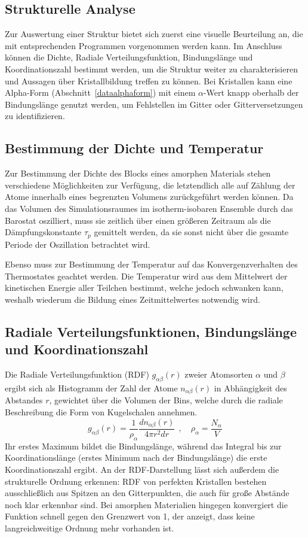 \subsection{Strukturelle Analyse}

Zur Auswertung einer Struktur bietet sich zuerst eine visuelle Beurteilung an, die mit entsprechenden Programmen vorgenommen werden kann.
Im Anschluss können die Dichte, Radiale Verteilungsfunktion, Bindungslänge und Koordinationszahl bestimmt werden, um die Struktur weiter zu charakterisieren und Aussagen über Kristallbildung treffen zu können.
Bei Kristallen kann eine Alpha-Form (Abschnitt~\ref{dataalphaform}) mit einem $\alpha$-Wert knapp oberhalb der Bindungslänge genutzt werden, um Fehlstellen im Gitter oder Gitterversetzungen zu identifizieren.

\subsection{Bestimmung der Dichte und Temperatur}

Zur Bestimmung der Dichte des Blocks eines amorphen Materials stehen verschiedene Möglichkeiten zur Verfügung, die letztendlich alle auf Zählung der Atome innerhalb eines begrenzten Volumens zurückgeführt werden können.
Da das Volumen des Simulationsraumes im isotherm-isobaren Ensemble durch das Barostat oszilliert, muss sie zeitlich über einen größeren Zeitraum als die Dämpfungskonstante $\tau_p$ gemittelt werden, da sie sonst nicht über die gesamte Periode der Oszillation betrachtet wird.

Ebenso muss zur Bestimmung der Temperatur auf das Konvergenzverhalten des Thermostates geachtet werden.
Die Temperatur wird aus dem Mittelwert der kinetischen Energie aller Teilchen bestimmt, welche jedoch schwanken kann, weshalb wiederum die Bildung eines Zeitmittelwertes notwendig wird.

\subsection{Radiale Verteilungsfunktionen, Bindungslänge und Koordinationszahl}

Die Radiale Verteilungsfunktion (RDF) $g_{\alpha\beta}(r)$ zweier Atomsorten $\alpha$ und $\beta$ ergibt sich als Histogramm der Zahl der Atome $n_{\alpha\beta}(r)$ in Abhängigkeit des Abstandes $r$, gewichtet über die Volumen der Bins, welche durch die radiale Beschreibung die Form von Kugelschalen annehmen.
\begin{equation}
  g_{\alpha\beta}(r) = \frac{1}{\rho_\alpha} \frac{d n_{\alpha\beta}(r)}{4 \pi r^2 dr} ~~,\quad \rho_\alpha = \frac{N_\alpha}{V}
\end{equation}
Ihr erstes Maximum bildet die Bindungslänge, während das Integral bis zur Koordinationslänge (erstes Minimum nach der Bindungslänge) die erste Koordinationszahl ergibt.
An der RDF-Darstellung lässt sich außerdem die strukturelle Ordnung erkennen:
RDF von perfekten Kristallen bestehen ausschließlich aus Spitzen an den Gitterpunkten, die auch für große Abstände noch klar erkennbar sind.
Bei amorphen Materialien hingegen konvergiert die Funktion schnell gegen den Grenzwert von 1, der anzeigt, dass keine langreichweitige Ordnung mehr vorhanden ist.

